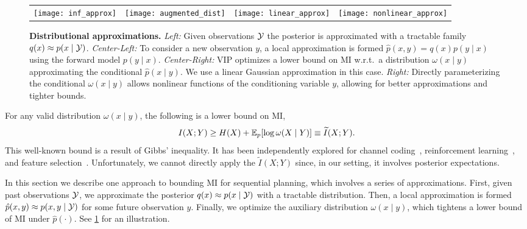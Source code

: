\begin{figure*}[t]
  \centering
  \begin{tabular}{cccc}
    \hspace{-9mm}\texttt{[image: inf\_approx]} &
    \hspace{-9mm}\texttt{[image: augmented\_dist]} &
    \hspace{-9mm}\texttt{[image: linear\_approx]} &
    \hspace{-9mm}\texttt{[image: nonlinear\_approx]}
  \end{tabular}

  \caption{\small \textbf{Distributional approximations.} \emph{Left:}
  Given observations $\mathcal{Y}$ the posterior is approximated with a
  tractable family $q(x) \approx p(x\mid \mathcal{Y})$.  \emph{Center-Left:}
  To consider a new observation $y$, a local approximation is formed
  $\hat{p}(x,y) = q(x) p(y \mid x)$ using the forward model $p(y\mid
  x)$.  \emph{Center-Right:} VIP optimizes a lower bound on MI
  w.r.t.~a distribution $\omega(x\mid y)$ approximating the
  conditional $\hat{p}(x\mid y)$. We use a linear Gaussian
  approximation in this case.  \emph{Right:} Directly parameterizing
  the conditional $\omega(x\mid y)$ allows nonlinear functions of the
  conditioning variable $y$, allowing for better approximations and
  tighter bounds.}

  \label{fig:approx}
\end{figure*}

For any valid distribution $\omega(x\mid y)$, the following is a lower
bound on MI,
\begin{equation}\label{eq:varmi}
  I(X;Y) \geq H(X) + \mathbb{E}_p[ \log \omega(X\mid Y) ] \equiv \widetilde{I}(X;Y).
\end{equation}
This well-known bound is a result of Gibbs' inequality.  It has been
independently explored for channel coding~\citep{agakov2004algorithm},
reinforcement learning~\citep{mohamed2015variational}, and feature
selection~\citep{gao2016variational, chen2018learning}.
Unfortunately, we cannot directly apply the $\widetilde{I}(X;Y)$
since, in our setting, it involves posterior expectations.

In this section we describe one approach to bounding MI for sequential
planning, which involves a series of approximations.  First, given
past observations $\mathcal{Y}$, we approximate the posterior
\mbox{$q(x)\approx p(x\mid \mathcal{Y})$} with a tractable distribution.
Then, a local approximation is formed \mbox{$\hat{p}(x,y) \approx
  p(x,y\mid \mathcal{Y})$} for some future observation $y$.  Finally, we
optimize the auxiliary distribution $\omega(x\mid y)$, which tightens
a lower bound of MI under $\hat{p}(\cdot)$.  See \FIG\ref{fig:approx}
for an illustration.

